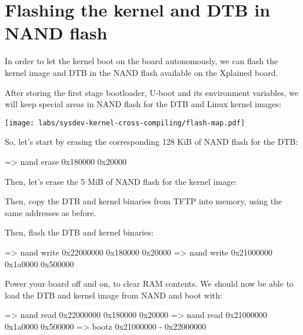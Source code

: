 \section{Flashing the kernel and DTB in NAND flash}

In order to let the kernel boot on the board autonomously, we can
flash the kernel image and DTB in the NAND flash available on the
Xplained board.

After storing the first stage bootloader, U-boot and its environment
variables, we will keep special areas in NAND flash for the DTB
and Linux kernel images:

\begin{center}
  \texttt{[image: labs/sysdev-kernel-cross-compiling/flash-map.pdf]}
\end{center}

So, let's start by erasing the corresponding 128 KiB of NAND flash
for the DTB:


\begin{ubootinput}
=> nand erase 0x180000 0x20000 %
\end{ubootinput}

Then, let's erase the 5 MiB of NAND flash for the kernel image:


Then, copy the DTB and kernel binaries from TFTP into memory, using the
same addresses as before.

Then, flash the DTB and kernel binaries:

\begin{ubootinput}
=> nand write 0x22000000 0x180000 0x20000 %
=> nand write 0x21000000 0x1a0000 0x500000
\end{ubootinput}

Power your board off and on, to clear RAM contents. We should now be
able to load the DTB and kernel image from NAND and boot with:

\begin{ubootinput}
=> nand read 0x22000000 0x180000 0x20000 %
=> nand read 0x21000000 0x1a0000 0x500000
=> bootz 0x21000000 - 0x22000000
\end{ubootinput}

